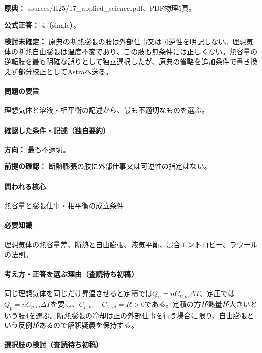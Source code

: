 \noindent\textbf{原典：} sources/H25/17\_applied\_science.pdf、PDF物理5頁。

\textbf{公式正答：} 4（single）。

\par\textbf{検討未確定：} 原典の断熱膨張の肢は外部仕事又は可逆性を明記しない。理想気体の断熱自由膨張は温度不変であり、この肢も無条件には正しくない。熱容量の逆転肢を最も明確な誤りとして独立選択したが、原典の省略を追加条件で書き換えず部分校正としてAstraへ送る。

\paragraph{問題の要旨} 理想気体と溶液・相平衡の記述から、最も不適切なものを選ぶ。

\paragraph{確認した条件・記述（独自要約）}\mbox{}\par

\noindent\textbf{方向：} 最も不適切。\par

\noindent\textbf{前提の確認：} 断熱膨張の肢に外部仕事又は可逆性の指定はない。\par

\paragraph{問われる核心} 熱容量と膨張仕事・相平衡の成立条件

\paragraph{必要知識} 理想気体の熱容量差、断熱と自由膨張、液気平衡、混合エントロピー、ラウールの法則。

\paragraph{考え方・正答を選ぶ理由（査読待ち初稿）} 同じ理想気体を同じだけ昇温させると定積では\(Q_V=nC_{V,m}\Delta T\)、定圧では\(Q_p=nC_{p,m}\Delta T\)を要し、\(C_{p,m}-C_{V,m}=R>0\)である。定積の方が熱量が大きいという肢4を選ぶ。断熱膨張の冷却は正の外部仕事を行う場合に限り、自由膨張という反例があるので解釈疑義を保持する。

\paragraph{選択肢の検討（査読待ち初稿）}\mbox{}\par

